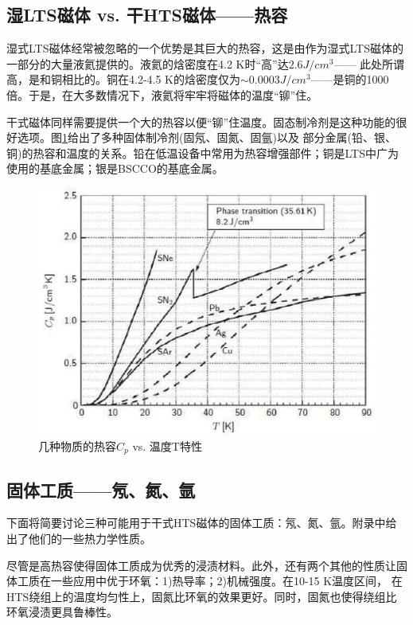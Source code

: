 \subsection{湿LTS磁体 vs. 干HTS磁体——热容}
湿式LTS磁体经常被忽略的一个优势是其巨大的热容，这是由作为湿式LTS磁体的一部分的大量液氦提供的。液氦的焓密度在4.2 K时“高”达$2.6 J/cm^3$——
此处所谓高，是和铜相比的。铜在4.2-4.5 K的焓密度仅为$\sim 0.0003J/cm^3$——是铜的1000倍。于是，在大多数情况下，液氦将牢牢将磁体的温度“铆”住。

干式磁体同样需要提供一个大的热容以便“铆”住温度。固态制冷剂是这种功能的很好选项。图\ref{fig:heatcap}给出了多种固体制冷剂(固氖、固氮、固氩)以及
部分金属(铅、银、铜)的热容和温度的关系。铅在低温设备中常用为热容增强部件；铜是LTS中广为使用的基底金属；银是BSCCO的基底金属。
\begin{figure}
  \centering
 \includegraphics[scale=0.7]{chpt4/figs/fig4.2.eps}
  \caption{几种物质的热容$C_p$ vs. 温度T特性}\label{fig:heatcap}
\end{figure}

\subsection{固体工质——氖、氮、氩}
下面将简要讨论三种可能用于干式HTS磁体的固体工质：氖、氮、氩。附录中给出了他们的一些热力学性质。

尽管是高热容使得固体工质成为优秀的浸渍材料。此外，还有两个其他的性质让固体工质在一些应用中优于环氧：1)热导率；2)机械强度。在10-15 K温度区间，
在HTS绕组上的温度均匀性上，固氮比环氧的效果更好。同时，固氮也使得绕组比环氧浸渍更具鲁棒性。

